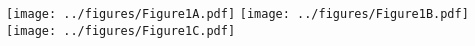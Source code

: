 \documentclass[class=minimal,border=0pt]{standalone}
\begin{document}
 \texttt{[image: ../figures/Figure1A.pdf]}
 \texttt{[image: ../figures/Figure1B.pdf]}
 \texttt{[image: ../figures/Figure1C.pdf]}
\end{document}
